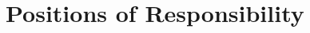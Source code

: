 \documentclass[a4paper,12pt]{extarticle} %
\let\oldtextbf\textbf
\renewcommand{\textbf}[1]{\textcolor{bold}{\oldtextbf{#1}}}
\begin{document}




\vspace{-0.3cm}
\section{\textcolor{primary}{Positions of Responsibility}}
\end{document}

